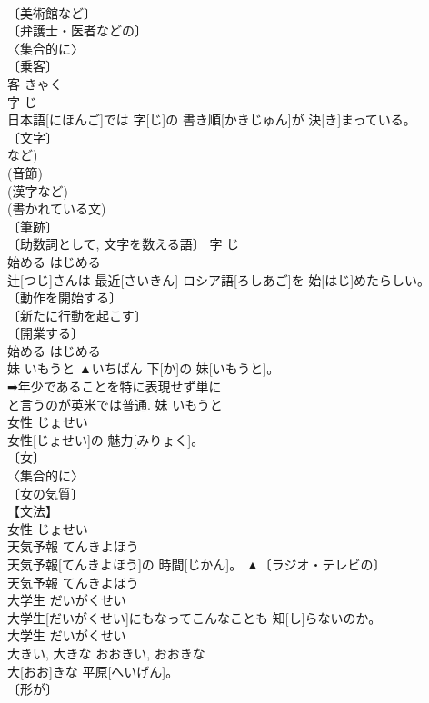 \documentclass[8pt]{extreport}
\begin{document}
\begin{CJK}{UTF8}{min}
\\	〔美術館など〕 
\\	〔弁護士・医者などの〕 
\\	〈集合的に〉 
\\	〔乗客〕 
\\	客	きゃく	
\\	字	じ	
\\	日本語[にほんご]では 字[じ]の 書き順[かきじゅん]が 決[き]まっている。	
\\	〔文字〕 
\\	など) 
\\	(音節) 
\\	(漢字など) 
\\	(書かれている文) 
\\	〔筆跡〕 
\\	〔助数詞として, 文字を数える語〕	字	じ	
\\	始める	はじめる	
\\	辻[つじ]さんは 最近[さいきん] ロシア語[ろしあご]を 始[はじ]めたらしい。	
\\	〔動作を開始する〕 
\\	〔新たに行動を起こす〕 
\\	〔開業する〕 
\\	始める	はじめる	
\\	妹	いもうと	▲いちばん 下[か]の 妹[いもうと]。	
\\	➡年少であることを特に表現せず単に 
\\	と言うのが英米では普通.	妹	いもうと	
\\	女性	じょせい	
\\	女性[じょせい]の 魅力[みりょく]。	
\\	〔女〕 
\\	〈集合的に〉 
\\	〔女の気質〕 
\\	【文法】 
\\	女性	じょせい	
\\	天気予報	てんきよほう	
\\	天気予報[てんきよほう]の 時間[じかん]。	▲〔ラジオ・テレビの〕 
\\	天気予報	てんきよほう	
\\	大学生	だいがくせい	
\\	大学生[だいがくせい]にもなってこんなことも 知[し]らないのか。	
\\	大学生	だいがくせい	
\\	大きい, 大きな	おおきい, おおきな	
\\	大[おお]きな 平原[へいげん]。	
\\	〔形が〕 

\end{CJK}
\end{document}
